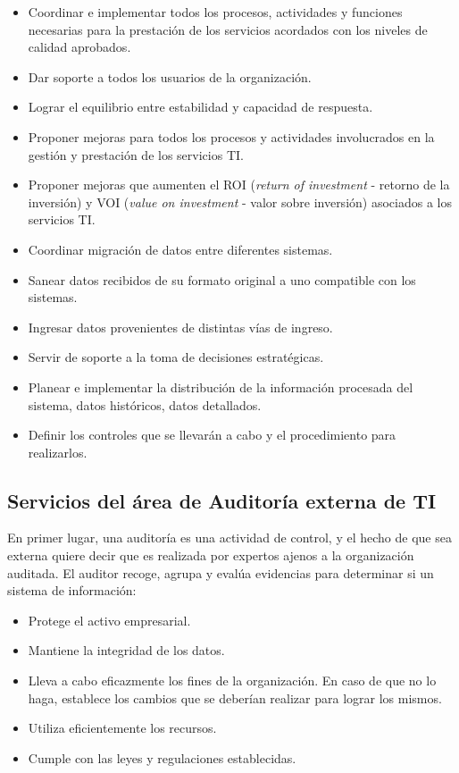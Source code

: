     \begin{itemize}
		\item Coordinar e implementar todos los procesos, actividades y funciones necesarias para la prestación de los servicios acordados con los niveles de calidad aprobados.
		\item Dar soporte a todos los usuarios de la organización.
		\item Lograr el equilibrio entre estabilidad y capacidad de respuesta.
		\item Proponer mejoras para todos los procesos y actividades involucrados en la gestión y prestación de los servicios TI.
		\item Proponer mejoras que aumenten el ROI (\textit{return of investment} - retorno de la inversión) y VOI (\textit{value on investment} - valor sobre inversión) asociados a los servicios TI.
        \item Coordinar migración de datos entre diferentes sistemas.
        \item Sanear datos recibidos de su formato original a uno compatible con los sistemas.
        \item Ingresar datos provenientes de distintas vías de ingreso.
        \item Servir de soporte a la toma de decisiones estratégicas.
        \item Planear e implementar la distribución de la información procesada del sistema, datos históricos, datos detallados.
        \item Definir los controles que se llevarán a cabo y el procedimiento para realizarlos.
        
	\end{itemize}
    
    \subsection{Servicios del área de Auditoría externa de TI}
    
    En primer lugar, una auditoría es una actividad de control, y el hecho de que sea externa quiere decir que es realizada por expertos ajenos a la organización auditada.
    El auditor recoge, agrupa y evalúa evidencias para determinar si un sistema de información:
    
    \begin{itemize}
		\item Protege el activo empresarial.
        \item Mantiene la integridad de los datos.
        \item Lleva a cabo eficazmente los fines de la organización. En caso de que no lo haga, establece los cambios que se deberían realizar para lograr los mismos.
        \item Utiliza eficientemente los recursos.
        \item Cumple con las leyes y regulaciones establecidas.
	\end{itemize}
    
